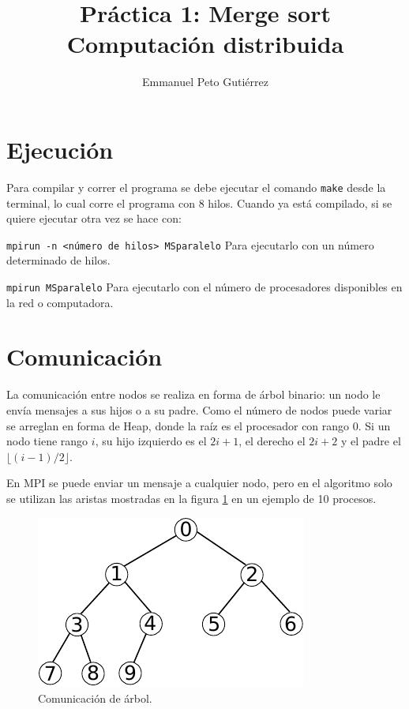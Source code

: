 \documentclass{article}
\author{Emmanuel Peto Gutiérrez}
\title{Práctica 1: Merge sort\\Computación distribuida}
\begin{document}
\maketitle

\section{Ejecución}

Para compilar y correr el programa se debe ejecutar el comando \texttt{make} desde la terminal, lo cual corre el programa con 8 hilos. Cuando ya está compilado, si se quiere ejecutar otra vez se hace con:

\texttt{mpirun -n <número de hilos> MSparalelo} Para ejecutarlo con un número determinado de hilos.

\texttt{mpirun MSparalelo} Para ejecutarlo con el número de procesadores disponibles en la red o computadora.

\section{Comunicación}

La comunicación entre nodos se realiza en forma de árbol binario: un nodo le envía mensajes a sus hijos o a su padre. Como el número de nodos puede variar se arreglan en forma de Heap, donde la raíz es el procesador con rango 0. Si un nodo tiene rango $i$, su hijo izquierdo es el $2i+1$, el derecho el $2i+2$ y el padre el $\lfloor (i-1)/2 \rfloor$.

En MPI se puede enviar un mensaje a cualquier nodo, pero en el algoritmo solo se utilizan las aristas mostradas en la figura \ref{heap} en un ejemplo de 10 procesos.

\begin{figure}[htbp]
\begin{center}
\includegraphics[scale=1]{red1}
\caption{Comunicación de árbol.}
\label{heap}
\end{center}
\end{figure}
\end{document}
